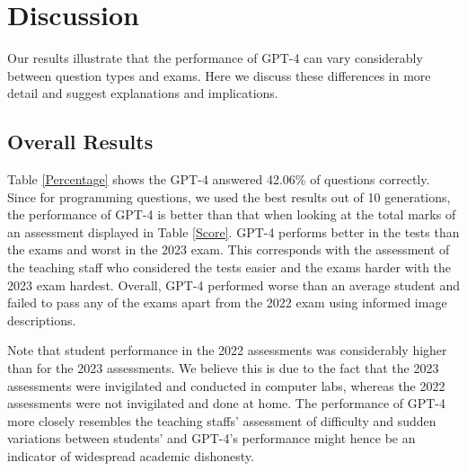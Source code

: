 \documentclass[sigconf,review]{acmart}
\begin{document}

\section{Discussion}

Our results illustrate that the performance of GPT-4 can vary considerably between question types and exams. Here we discuss these differences in more detail and suggest explanations and implications.

\subsection{Overall Results}

Table \ref{Percentage} shows the GPT-4 answered 42.06\% of questions correctly. Since for programming questions, we used the best results out of 10 generations, the performance of GPT-4 is better than that when looking at the total marks of an assessment displayed in Table \ref{Score}. GPT-4 performs better in the tests than the exams and worst in the 2023 exam. This corresponds with the assessment of the teaching staff who considered the tests easier and the exams harder with the 2023 exam hardest. Overall, GPT-4 performed worse than an average student and failed to pass any of the exams apart from the 2022 exam using informed image descriptions.

Note that student performance in the 2022 assessments was considerably higher than for the 2023 assessments. We believe this is due to the fact that the 2023 assessments were invigilated and conducted in computer labs, whereas the 2022 assessments were not invigilated and done at home. The performance of GPT-4 more closely resembles the teaching staffs' assessment of difficulty and sudden variations between students' and GPT-4's performance might hence be an indicator of widespread academic dishonesty.
\end{document}
